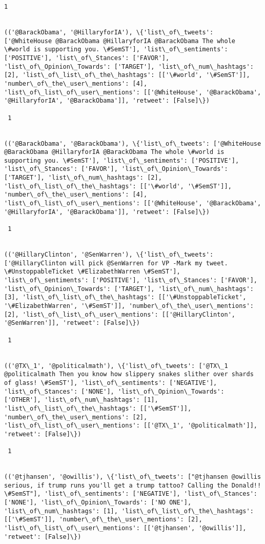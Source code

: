 \documentclass[11pt]{article}
\begin{document}
\begin{Verbatim}[commandchars=\\\{\}]
 1
 

(('@BarackObama', '@HillaryforIA'), \{'list\_of\_tweets': ['@WhiteHouse @BarackObama @HillaryforIA @BarackObama The whole \#world is supporting you. \#SemST'], 'list\_of\_sentiments': ['POSITIVE'], 'list\_of\_Stances': ['FAVOR'], 'list\_of\_Opinion\_Towards': ['TARGET'], 'list\_of\_num\_hashtags': [2], 'list\_of\_list\_of\_the\_hashtags': [['\#world', '\#SemST']], 'number\_of\_the\_user\_mentions': [4], 'list\_of\_list\_of\_user\_mentions': [['@WhiteHouse', '@BarackObama', '@HillaryforIA', '@BarackObama']], 'retweet': [False]\})

 1
 

(('@BarackObama', '@BarackObama'), \{'list\_of\_tweets': ['@WhiteHouse @BarackObama @HillaryforIA @BarackObama The whole \#world is supporting you. \#SemST'], 'list\_of\_sentiments': ['POSITIVE'], 'list\_of\_Stances': ['FAVOR'], 'list\_of\_Opinion\_Towards': ['TARGET'], 'list\_of\_num\_hashtags': [2], 'list\_of\_list\_of\_the\_hashtags': [['\#world', '\#SemST']], 'number\_of\_the\_user\_mentions': [4], 'list\_of\_list\_of\_user\_mentions': [['@WhiteHouse', '@BarackObama', '@HillaryforIA', '@BarackObama']], 'retweet': [False]\})

 1
 

(('@HillaryClinton', '@SenWarren'), \{'list\_of\_tweets': ['@HillaryClinton will pick @SenWarren for VP -Mark my tweet. \#UnstoppableTicket \#ElizabethWarren \#SemST'], 'list\_of\_sentiments': ['POSITIVE'], 'list\_of\_Stances': ['FAVOR'], 'list\_of\_Opinion\_Towards': ['TARGET'], 'list\_of\_num\_hashtags': [3], 'list\_of\_list\_of\_the\_hashtags': [['\#UnstoppableTicket', '\#ElizabethWarren', '\#SemST']], 'number\_of\_the\_user\_mentions': [2], 'list\_of\_list\_of\_user\_mentions': [['@HillaryClinton', '@SenWarren']], 'retweet': [False]\})

 1
 

(('@TX\_1', '@politicalmath'), \{'list\_of\_tweets': ['@TX\_1 @politicalmath Then you know how slippery snakes slither over shards of glass! \#SemST'], 'list\_of\_sentiments': ['NEGATIVE'], 'list\_of\_Stances': ['NONE'], 'list\_of\_Opinion\_Towards': ['OTHER'], 'list\_of\_num\_hashtags': [1], 'list\_of\_list\_of\_the\_hashtags': [['\#SemST']], 'number\_of\_the\_user\_mentions': [2], 'list\_of\_list\_of\_user\_mentions': [['@TX\_1', '@politicalmath']], 'retweet': [False]\})

 1
 

(('@tjhansen', '@owillis'), \{'list\_of\_tweets': ["@tjhansen @owillis serious, if trump runs you'll get a trump tattoo? Calling the Donald!! \#SemST"], 'list\_of\_sentiments': ['NEGATIVE'], 'list\_of\_Stances': ['NONE'], 'list\_of\_Opinion\_Towards': ['NO ONE'], 'list\_of\_num\_hashtags': [1], 'list\_of\_list\_of\_the\_hashtags': [['\#SemST']], 'number\_of\_the\_user\_mentions': [2], 'list\_of\_list\_of\_user\_mentions': [['@tjhansen', '@owillis']], 'retweet': [False]\})


\end{Verbatim}
\end{document}
